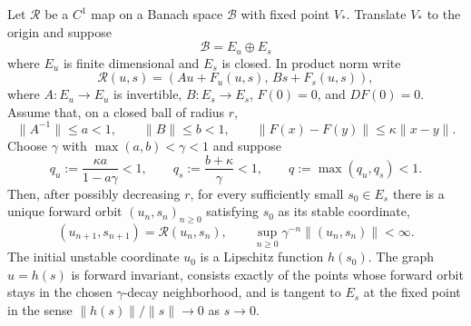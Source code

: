 \begin{theorem}
\label{thm:rg-local-stable-manifold}
Let \(\mathcal R\) be a \(C^1\) map on a Banach space \(\mathcal B\) with
fixed point \(V_\ast\).  Translate \(V_\ast\) to the origin and suppose
\[
  \mathcal B=E_u\oplus E_s
\]
where \(E_u\) is finite dimensional and \(E_s\) is closed.  In product norm
write
\begin{equation}
  \mathcal R(u,s)
  =
  (Au+F_u(u,s),\,Bs+F_s(u,s)),
  \label{eq:rg-stable-map-splitting}
\end{equation}
where \(A:E_u\to E_u\) is invertible, \(B:E_s\to E_s\), \(F(0)=0\),
and \(DF(0)=0\).  Assume that, on a closed ball of radius \(r\),
\begin{equation}
  \|A^{-1}\|\leq a<1,\qquad
  \|B\|\leq b<1,\qquad
  \|F(x)-F(y)\|\leq \kappa\|x-y\|.
  \label{eq:rg-stable-spectral-gap-constants}
\end{equation}
Choose \(\gamma\) with \(\max(a,b)<\gamma<1\) and suppose
\begin{equation}
  q_u:=\frac{\kappa a}{1-a\gamma}<1,
  \qquad
  q_s:=\frac{b+\kappa}{\gamma}<1,
  \qquad
  q:=\max(q_u,q_s)<1 .
  \label{eq:rg-stable-contraction-constants}
\end{equation}
Then, after possibly decreasing \(r\), for every sufficiently small
\(s_0\in E_s\) there is a unique forward orbit
\((u_n,s_n)_{n\geq0}\) satisfying \(s_0\) as its stable coordinate,
\[
  (u_{n+1},s_{n+1})=\mathcal R(u_n,s_n),
  \qquad
  \sup_{n\geq0}\gamma^{-n}\|(u_n,s_n)\|<\infty .
\]
The initial unstable coordinate \(u_0\) is a Lipschitz function \(h(s_0)\).
The graph \(u=h(s)\) is forward invariant, consists exactly of the points
whose forward orbit stays in the chosen \(\gamma\)-decay neighborhood, and
is tangent to \(E_s\) at the fixed point in the sense
\(\|h(s)\|/\|s\|\to0\) as \(s\to0\).
\end{theorem}

